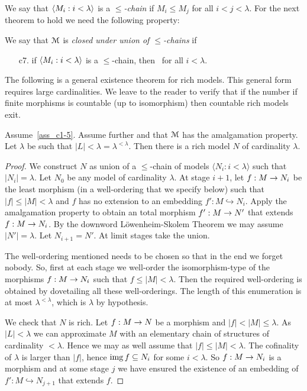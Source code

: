 \documentclass[creche.tex]{subfiles}
\begin{document}
We say that $\langle M_i:i<\lambda\rangle$ is a \emph{$\le$-chain\/} if $M_i\le M_j$ for all $i<j<\lambda$. For the next theorem to hold we need the following property:

\begin{definition}
We say that $\EuScript M$ is \emph{closed under union of $\le$-chains\/} if
\begin{itemize}
\item[c7.] if $\langle M_i:i<\lambda\rangle$ is a $\le$-chain,  then  \ for all $i<\lambda$.\QED
\end{itemize}
\end{definition}

The following is a general existence theorem for rich models. This general form requires large cardinalities. We leave to the reader to verify that if the number if finite morphisms is countable (up to isomorphism) then countable rich models exit.

\begin{theorem}  Assume~\ref{ass_c1-5}. Assume further  and that $\EuScript M$ has the amalgamation property. Let $\lambda$ be such that $|L|<\lambda=\lambda^{<\lambda}$.  Then there is a rich model $N$ of cardinality $\lambda$.
\end{theorem}

\begin{proof} We construct $N$ as union of a $\le$-chain of models $\langle N_i:i < \lambda\rangle$ such that $|N_i| = \lambda$. Let $N_0$ be any model of cardinality $\lambda$. At stage $i+1$, let $f:M\rightarrow N_i$ be the least morphism (in a well-ordering that we specify below) such that $|f|\le|M|<\lambda$ and $f$ has no extension to an embedding $f':M\hookrightarrow N_i$. Apply the amalgamation property to obtain an total morphism $f':M\rightarrow N'$ that extends $f:M\rightarrow N_i$. By the downword L\"owenheim-Skolem Theorem we may assume $|N'|=\lambda$. Let $N_{i+1}=N'$. At limit stages take the union.

The well-ordering mentioned needs to be chosen so that in the end we forget nobody. So, first at each stage we well-order the isomorphism-type of the morphisms $f:M\rightarrow N_i$ such that  $f\le|M|<\lambda$. Then the required well-ordering is obtained by dovetailing all these well-orderings.  The length of this enumeration is at most $\lambda^{<\lambda}$, which is $\lambda$ by hypothesis.

We check that $N$ is rich. Let $f:M\rightarrow N$ be a morphism and $|f|<|M|\le\lambda$. As $|L|<\lambda$ we can approximate $M$ with an elementary chain of structures of cardinality $<\lambda$. Hence we may as well assume that $|f|\le|M|<\lambda$. The cofinality of $\lambda$ is larger than $|f|$, hence $\mathop{\rm img} f\subseteq N_i$ for some $i<\lambda$. So $f:M\rightarrow N_i$ is a morphism and at some stage $j$ we have ensured the existence of an embedding of $f':M\hookrightarrow N_{j+1}$ that extends $f$.
\end{proof}
\end{document}
